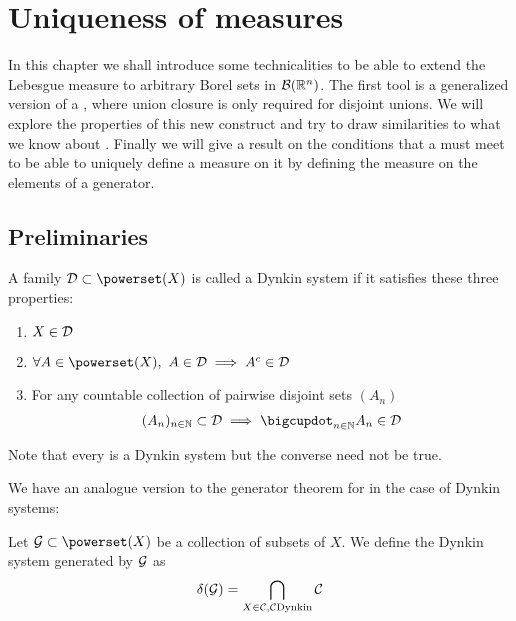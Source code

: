 
\chapter{Uniqueness of measures}

In this chapter we shall introduce some technicalities to be able to extend the Lebesgue measure to arbitrary Borel sets in $\mathcal{B}(\mathbb{R}^n)$. The first tool is a generalized version of a \siga, where union closure is only required for disjoint unions. We will explore the properties of this new construct and try to draw similarities to what we know about \sigas. Finally we will give a result on the conditions that a \siga must meet to be able to uniquely define a measure on it by defining the measure on the elements of a generator.

\section{Preliminaries}


\begin{dfn}
	A family $\calD \subset \powerset(X)$ is called a Dynkin system if it satisfies these three properties:
	\begin{enumerate}
		\item $X \in \mathcal{D}$
		\item $\forall A \in \powerset(X),\ A \in \calD \implies A^\complement \in \calD$
		\item For any countable collection of pairwise disjoint sets $(A_n)$
		\begin{align*}
			(A_n)_{n\in\N} \subset \calD \implies \bigcupdot_{n \in \N} A_n \in \calD
		\end{align*}
	\end{enumerate}
\end{dfn}

Note that every \siga is a Dynkin system but the converse need not be true.

We have an analogue version to the generator theorem for \sigas in the case of Dynkin systems:

\begin{dfn}
	Let $\calG \subset \powerset(X)$ be a collection of subsets of $X$. We define the Dynkin system generated by $\mathcal{G}$ as
	\begin{align*}
		\delta(\mathcal{G}) = \bigcap_{X \in \mathcal{C}, \mathcal{C} \text{Dynkin}} \mathcal{C}
	\end{align*}
\end{dfn}

